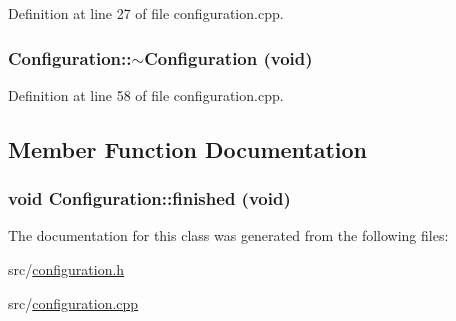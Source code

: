 Definition at line 27 of file configuration.cpp.\hypertarget{classConfiguration_094b6e765719f7a801524abac5e46475}{
\subsubsection[{$\sim$Configuration}]{\setlength{\rightskip}{0pt plus 5cm}Configuration::$\sim$Configuration (void)}}
\label{classConfiguration_094b6e765719f7a801524abac5e46475}




Definition at line 58 of file configuration.cpp.

\subsection{Member Function Documentation}
\hypertarget{classConfiguration_84909e3f2258ba02ee1120cbbf894348}{
\subsubsection[{finished}]{\setlength{\rightskip}{0pt plus 5cm}void Configuration::finished (void)}}
\label{classConfiguration_84909e3f2258ba02ee1120cbbf894348}




The documentation for this class was generated from the following files:\begin{CompactItemize}
\item 
src/\hyperlink{configuration_8h}{configuration.h}\item 
src/\hyperlink{configuration_8cpp}{configuration.cpp}\end{CompactItemize}
